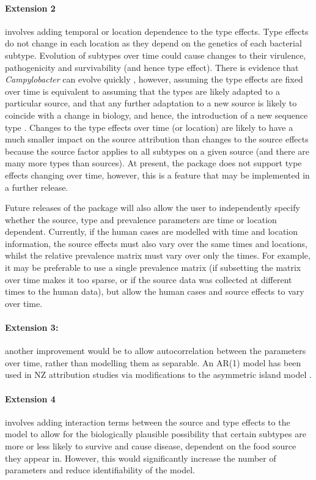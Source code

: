 \paragraph{Extension 2} involves adding temporal or location dependence to the type effects. Type effects do not change in each location as they depend on the genetics of each bacterial 
subtype. Evolution of subtypes over time could cause changes to their virulence, pathogenicity and survivability (and hence type effect). There is evidence that 
\emph{Campylobacter} can evolve quickly \cite{WilGabLeath09}, however, assuming the type effects are fixed over time is equivalent to assuming that the types are likely adapted to a particular source, and 
that any further adaptation to a new source is likely to coincide with a change in biology, and hence, the introduction of a new sequence type \citep{FreMar09}. Changes to the type effects over time 
(or location) are likely to have a much smaller impact on the source attribution than changes to the source effects because the source factor applies to all subtypes on a given source (and there are 
many more types than sources). At present, the package does not support type effects changing over time, however, this is a feature that may be implemented in a further release. 

Future releases of the package will also allow the user to independently specify whether the source, type and prevalence parameters are time or location dependent. Currently, if the human cases are 
modelled with time and location information, the source effects must also vary over the same times and locations, whilst the relative prevalence matrix must vary over only the times. For example, it may be preferable to use a single prevalence matrix (if subsetting the matrix over time makes it too sparse, or if the source data was collected at different times to the human data), but allow the human cases and source effects to vary over time.

\paragraph{Extension 3:} another improvement would be to allow autocorrelation between the parameters over time, rather than modelling them as separable. An AR(1) model has been used in NZ attribution studies via modifications to the asymmetric island model \citep{FreMar15}.

\paragraph{Extension 4} involves adding interaction terms between the source and type effects to the model to allow for the biologically plausible possibility that certain subtypes are more or less 
likely to survive and cause disease, dependent on the food source they appear in. However, this would significantly increase the number of parameters and reduce identifiability of the model. 
